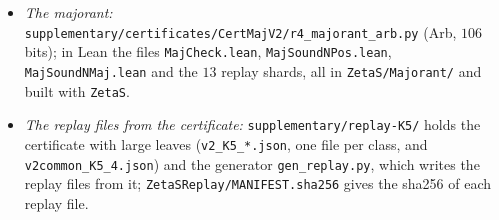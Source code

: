 \begin{itemize}
\texttt{bnb\_lb3.py} with \texttt{polywin.py}; the driver logs of the run and of the re-run, which end with \texttt{ALL SHARDS OK}),
\texttt{CertAM5/} (\texttt{bnb\_interval\_w.py}, the $K=5$ run, with its driver \texttt{runcert.sh}) and \texttt{CertAM7/}
(\texttt{bnb\_lb3\_w.py}, the LB3 engine with the all-marks check, with its driver \texttt{runlb3.sh}, and the exact constants
\texttt{pexact2.py}), each with its data and logs; and \texttt{common/}, with the input checks \texttt{verify\_inputs.py} (weights
nonnegative, span sums $2$, penalties summing to $\nu$, claims exactly $\sum_ib_i(m_i)$, all patterns covered) and \texttt{d819\_exact.py}.
\item \emph{The majorant:} \texttt{supplementary/certificates/CertMajV2/r4\_majorant\_arb.py} (Arb, $106$ bits); in Lean the files
\texttt{MajCheck.lean}, \texttt{MajSoundNPos.lean}, \texttt{MajSoundNMaj.lean} and the $13$ replay shards, all in \texttt{ZetaS/Majorant/}
and built with \texttt{ZetaS}.
\item \emph{The replay files from the certificate:} \texttt{supplementary/replay-K5/} holds the certificate with large leaves
(\texttt{v2\_K5\_*.json}, one file per class, and \texttt{v2common\_K5\_4.json}) and the generator \texttt{gen\_replay.py}, which writes the
replay files from it; \texttt{ZetaSReplay/MANIFEST.sha256} gives the sha256 of each replay file.
\end{itemize}
